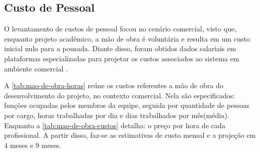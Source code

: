 \documentclass[
	12pt,				%
	openany,			%
	oneside,			%
	a4paper,			%
	english,			%
	french,				%
	spanish,			%
	brazil				%
	]{abntex2}
\begin{document}

\subsection{Custo de Pessoal}
O levantamento de custos de pessoal focou no cenário comercial, visto que, enquanto projeto acadêmico, a mão de obra é voluntária e resulta em um custo inicial nulo para a pousada. Diante disso, foram obtidos dados salariais em plataformas especializadas para projetar os custos associados ao sistema em  ambiente comercial \cite{glassdoor2025, indeed2025}. 

A \autoref{tab:mao-de-obra-horas} reúne os custos referentes a mão de obra do desenvolvimento do projeto, no contexto comercial. 
Nela são especificados: funções ocupadas pelos membros da equipe, seguida por quantidade de pessoas por cargo, horas trabalhadas por dia e dias trabalhados por mês(média). Enquanto a \autoref{tab:mao-de-obra-custos} detalha: o preço por hora de cada profissional. A partir disso, faz-se as estimativas de custo mensal e a projeção em 4 meses e 9 meses.
\end{document}
